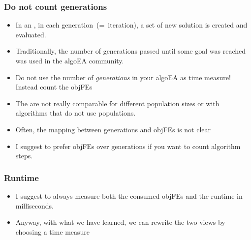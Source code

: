 \documentclass[aspectratio=169,mathserif,notheorems]{beamer}%
\begin{document}
\begin{frame}\frametitle{Do not count generations}%
\begin{itemize}%
\item In an \cite{W2009GOATAA,BFM1997HOEC}, in each generation~(=~iteration), a set of new solution is created and evaluated.%
\item<2-> Traditionally, the number of generations passed until some goal was reached was used in the \gls{algoEA} community.%
\item<3-> Do not use the number of \emph{generations} in your \gls{algoEA} as time measure! Instead count the \glspl{objFE}%
\item<4-> The  are not really comparable for different population sizes or with algorithms that do not use populations.%
\item<5-> Often, the mapping between generations and \glspl{objFE} is not clear%
%
\item<10-> I suggest to prefer \glspl{objFE} over generations if you want to count algorithm steps.%
%
\end{itemize}%
\end{frame}%
%
\begin{frame}%
\frametitle{Runtime}%
\begin{itemize}%
\item I suggest to always measure both the consumed \glspl{objFE} and the runtime in milliseconds.%
\item<2-> Anyway, with what we have learned, we can rewrite the two views by choosing a time measure\cite{WNT2010AAOAB,HAFR2010RPBBOB2ES}%
\end{itemize}%
\end{frame}%
\end{document}
